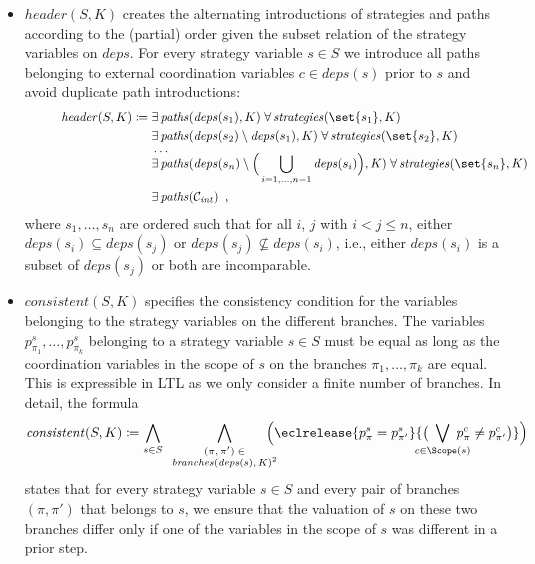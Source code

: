 \documentclass{LMCS}
\newcommand{\deps}{\mathit{deps}}
\newcommand{\branches}{\mathit{branches}}
\newcommand{\paths}{\mathit{paths}}
\newcommand{\strategies}{\mathit{strategies}}
\newcommand{\header}{\mathit{header}}
\newcommand{\consistent}{\mathit{consistent}}
\theoremstyle{plain}\newtheorem{theorem}[thm]{Theorem}
\theoremstyle{plain}\newtheorem{lemma}[thm]{Lemma}
\theoremstyle{plain}\newtheorem{proposition}[thm]{Proposition}
\theoremstyle{plain}\newtheorem{corollary}[thm]{Corollary}
\theoremstyle{definition}\newtheorem{definition}{Definition}[section]
\begin{document}
\begin{itemize}
  \item $\header(S,K)$ creates the alternating introductions of strategies and paths according to the (partial) order given the subset relation of the strategy variables on $\deps$.
    For every strategy variable $s \in S$ we introduce all paths belonging to external coordination variables $c \in \deps(s)$ prior to $s$ and avoid duplicate path introductions: 
    \begin{align*}
      \hspace{1cm}\header(S,K) \coloneqq {}
      &\exists\, \paths(\deps(s_1), K) \; \forall\, \strategies(\set{s_1}, K) \\
      &\exists\, \paths(\deps(s_2) \setminus \deps(s_1), K) \; \forall\, \strategies(\set{s_2}, K) \\[-5pt]
      & \dots \\[-7pt]
      &\exists\, \paths(\deps(s_n) \setminus \Big(\bigcup_{i=1,\dots,n-1} \deps(s_i)\Big), K) \; \forall\, \strategies(\set{s_n}, K) \\
      &\exists\, \paths(\mathcal{C}_\mathit{int}) \enspace ,
    \end{align*}
    where $s_1,\dots,s_n$ are ordered such that for all $i$, $j$ with $i < j \leq n$, either $\deps(s_i) \subseteq \deps(s_j)$ or $\deps(s_j) \nsubseteq \deps(s_i)$, i.e., either $\deps(s_i)$ is a subset of $\deps(s_j)$ or both are incomparable.
    
   \item $\consistent(S,K)$ specifies the consistency condition for the variables belonging to the strategy variables on the different branches.
    The variables $p^s_{\pi_1},\dots,p^s_{\pi_k}$ belonging to a strategy variable $s \in S$ must be equal as long as the coordination variables in the scope of $s$ on the branches $\pi_1,\dots,\pi_k$ are equal.
    This is expressible in LTL as we only consider a finite number of branches.
    In detail, the formula
    \begin{equation} \label{eq:consistency_conditon_qptl}
      \consistent(S,K) \coloneqq \bigwedge_{s \in S}
      \bigwedge_{\scriptsize\begin{array}{c}(\pi,\pi') \in \\\branches(\deps(s),K)^2\end{array}}
      \hspace{-15pt}
      \Big( \eclrelease{p^s_\pi = p^s_{\pi'}}{\big( \hspace{-12pt} \bigvee_{c \in \Scope(s)} \hspace{-12pt} p^c_\pi \neq p^c_{\pi'} \big)} \Big)
    \end{equation}
    states that for every strategy variable $s \in S$ and every pair of branches $(\pi,\pi')$ that belongs to $s$, we ensure that the valuation of $s$ on these two branches differ only if one of the variables in the scope of $s$ was different in a prior step.
   
\end{itemize}
\end{document}
